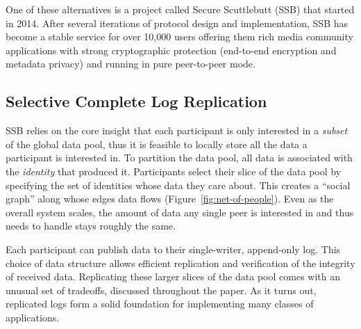 \documentclass[9pt,sigconf]{acmart}
\begin{document}
One of these alternatives is a project called Secure Scuttlebutt (SSB)
that started in 2014. After several iterations of protocol design and
implementation, SSB has become a stable service for over 10,000 users
offering them rich media community applications with strong
cryptographic protection (end-to-end encryption and metadata privacy)
and running in pure peer-to-peer mode.

\subsection*{Selective Complete Log Replication}

SSB relies on the core insight that each  participant is only interested in a \textit{subset} of the global data pool, thus it is feasible to locally store all the data a participant is interested in. To partition the data pool, all data is associated with the \textit{identity} that produced it. Participants select their slice of the data pool by specifying the set of identities whose data they care about. This creates a ``social graph'' along whose edges data flows (Figure~\ref{fig:net-of-people}). Even as the overall system scales, the amount of data any single peer is interested in and thus needs to handle stays roughly the same.

Each participant can publish data to their single-writer, append-only log. This choice of data structure allows efficient replication and verification of the integrity of received data. Replicating these larger slices of the data pool comes with an unusual set of tradeoffs, discussed throughout the paper. As it turns out, replicated logs form a solid foundation for implementing many classes of applications.

\end{document}
